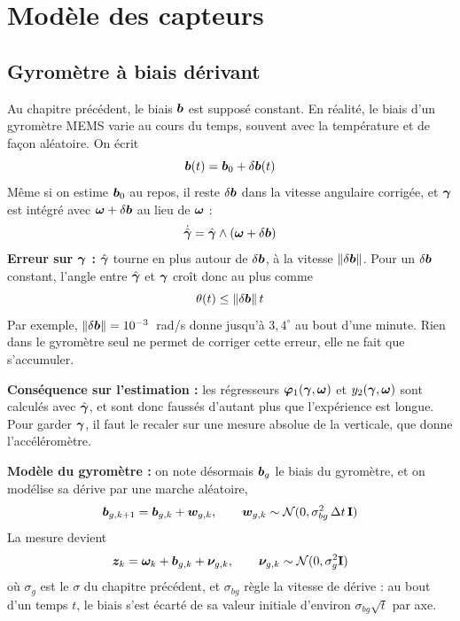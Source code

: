 
\section{Modèle des capteurs}

\subsection{Gyromètre à biais dérivant}

Au chapitre précédent, le biais $\bm{b}$ est supposé constant. En
réalité, le biais d'un gyromètre MEMS varie au cours du temps, souvent avec la
température et de façon aléatoire. On écrit
\[
    \bm{b}(t) = \bm{b}_0 + \delta\bm{b}(t)
\]
Même si on estime $\bm{b}_0$ au repos, il reste $\delta\bm{b}$ dans
la vitesse angulaire corrigée, et $\bm{\gamma}$ est intégré avec
$\bm{\omega} + \delta\bm{b}$ au lieu de $\bm{\omega}$ :
\[
    \dot{\hat{\bm{\gamma}}} = \hat{\bm{\gamma}}\wedge(\bm{\omega} + \delta\bm{b})
\]
\textbf{Erreur sur $\bm{\gamma}$ : } $\hat{\bm{\gamma}}$ tourne en
plus autour de $\delta\bm{b}$, à la vitesse $\|\delta\bm{b}\|$. Pour
un $\delta\bm{b}$ constant, l'angle entre $\hat{\bm{\gamma}}$ et
$\bm{\gamma}$ croît donc au plus comme
\[
    \theta(t) \le \|\delta\bm{b}\|\,t
\]
Par exemple, $\|\delta\bm{b}\| = 10^{-3}$~rad/s donne jusqu'à
$3{,}4^\circ$ au bout d'une minute. Rien dans le gyromètre seul ne
permet de corriger cette erreur, elle ne fait que s'accumuler.

\textbf{Conséquence sur l'estimation : } les régresseurs
$\bm{\varphi}_1(\bm{\gamma}, \bm{\omega})$ et
$y_2(\bm{\gamma}, \bm{\omega})$ sont calculés avec
$\hat{\bm{\gamma}}$, et sont donc faussés d'autant plus que
l'expérience est longue. Pour garder $\bm{\gamma}$, il faut le
recaler sur une mesure absolue de la verticale, que donne
l'accéléromètre.


\textbf{Modèle du gyromètre : } on note désormais $\bm{b}_g$ le biais
du gyromètre, et on modélise sa dérive par une marche aléatoire,
\[
    \bm{b}_{g,k+1} = \bm{b}_{g,k} + \bm{w}_{g,k},
    \qquad
    \bm{w}_{g,k} \sim \mathcal{N}(0, \sigma_{bg}^2\,\Delta t\,\mathbf{I})
\]
La mesure devient
\[
    \bm{z}_k = \bm{\omega}_k + \bm{b}_{g,k} + \bm{\nu}_{g,k},
    \qquad
    \bm{\nu}_{g,k} \sim \mathcal{N}(0, \sigma_g^2\mathbf{I})
\]
où $\sigma_g$ est le $\sigma$ du chapitre précédent, et $\sigma_{bg}$
règle la vitesse de dérive : au bout d'un temps $t$, le biais s'est
écarté de sa valeur initiale d'environ $\sigma_{bg}\sqrt{t}$ par axe.

